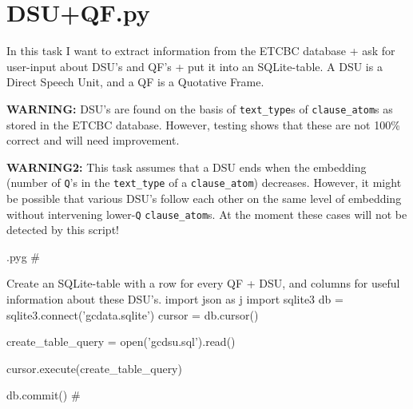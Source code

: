 \documentclass{report}
\makeatletter
\newcommand{\mi}[1]{\lstinline{#1}}
\newenvironment{python}{%
  \VerbatimEnvironment
  \minted@resetoptions
  \setkeys{minted@opt}{}
      \begin{VerbatimOut}{\jobname.pyg}}
{%
      \end{VerbatimOut}
      \minted@pygmentize{python}
      \DeleteFile{\jobname.pyg}}
\makeatother
\begin{document}
\chapter{DSU+QF.py}
\lstset{language=python,basicstyle=\ttfamily}

\begin{multicols}{2}
In this task I want to extract information from the ETCBC database + ask for user-input about DSU's and QF's + put it into an SQLite-table.
A DSU is a Direct Speech Unit, and a QF is a Quotative Frame.

\textbf{WARNING:} DSU's are found on the basis of \mi{text_type}s of \mi{clause_atom}s as stored in the ETCBC database. However, testing shows that these are not 100\% correct and will need improvement.

\textbf{WARNING2:} This task assumes that a DSU ends when the embedding (number of \mi{Q}'s in the \mi{text_type} of a \mi{clause_atom}) decreases.
However, it might be possible that various DSU's follow each other on the same level of embedding without intervening lower-\mi{Q} \mi{clause_atom}s.
At the moment these cases will not be detected by this script!
\end{multicols}

\begin{python}
#{{{ Create an SQLite-table with a row for every QF + DSU, and columns for useful information about these DSU's.
import json as j
import sqlite3
db = sqlite3.connect('gcdata.sqlite')
cursor = db.cursor()

create_table_query = open('gcdsu.sql').read()

cursor.execute(create_table_query)

db.commit()
#}}}
\end{python}
\end{document}
